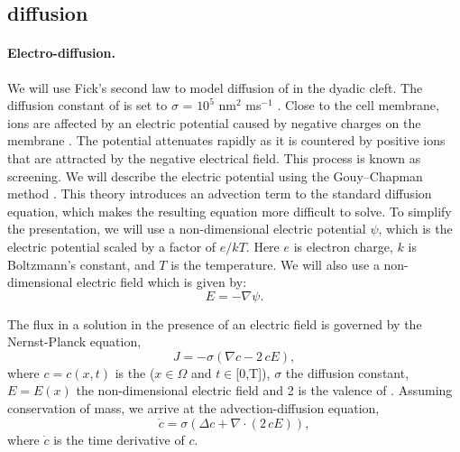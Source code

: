 \subsection{\Ca diffusion}
\label{sec:hake:ca-diffusion}

\paragraph{Electro-diffusion.}
  
  

We will use Fick's second law to model diffusion of \Ca in the dyadic
cleft. The diffusion constant of \Ca is set to $\sigma$ = $10^5$
nm$^2$ ms$^{-1}$ \citep{LangerPeskoff1996}. Close to the cell membrane,
ions are affected by an electric potential caused by negative charges
on the membrane
\citep{McLaughlinSzaboEisenman1971,LangnerCafisoMarceljaEtAl1990}. The
potential attenuates rapidly as it is countered by positive ions that
are attracted by the negative electrical field. This process is known
as screening. We will describe the electric potential using the
Gouy--Chapman method \citep{Grahame1947}. This theory introduces an
advection term to the standard diffusion equation, which makes the
resulting equation more difficult to solve. To simplify the
presentation, we will use a non-dimensional electric potential $\psi$,
which is the electric potential scaled by a factor of $e/kT$. Here $e$
is electron charge, $k$ is Boltzmann's constant, and $T$ is the
temperature. We will also use a non-dimensional electric field which
is given by:
\begin{equation}
  \label{eq:hake:electric_field}
  E=-\nabla\psi.
\end{equation}

The \Ca flux in a solution in the presence of an electric field is
governed by the Nernst-Planck equation,
\begin{equation}
  \label{eq:hake:nernst-planck}
  J = -\sigma\left(\nabla c-2\,cE\right),
\end{equation}
where $c = c(x,t)$ is the \CaC ($x\in\Omega$ and $t\in$[0,T]),
$\sigma$ the diffusion constant, $E = E(x)$ the non-dimensional
electric field and 2 is the valence of \Ca. Assuming conservation of
mass, we arrive at the advection-diffusion equation,
\begin{equation}
  \label{eq:hake:advection-diffusion}
  \dot{c}=\sigma\left(\Delta c + \nabla\cdot\left(2\,cE\right)\right),
\end{equation}
where $\dot{c}$ is the time derivative of $c$.

